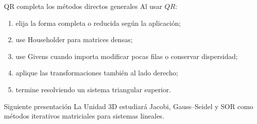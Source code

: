 \documentclass[aspectratio=169,12pt]{beamer}
\begin{document}
\begin{frame}{QR completa los métodos directos generales}
Al usar $QR$:
\begin{enumerate}
  \item elija la forma completa o reducida según la aplicación;
  \item use Householder para matrices densas;
  \item use Givens cuando importa modificar pocas filas o conservar dispersidad;
  \item aplique las transformaciones también al lado derecho;
  \item termine resolviendo un sistema triangular superior.
\end{enumerate}
\begin{block}{Siguiente presentación}
La Unidad 3D estudiará Jacobi, Gauss--Seidel y SOR como métodos iterativos
matriciales para sistemas lineales.
\end{block}
\end{frame}
\end{document}

